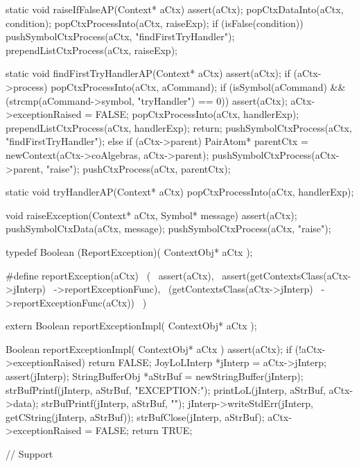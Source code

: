 static void raiseIfFalseAP(Context* aCtx) {
  assert(aCtx);
  popCtxDataInto(aCtx, condition);
  popCtxProcessInto(aCtx, raiseExp);
  if (isFalse(condition)) {
    pushSymbolCtxProcess(aCtx, "findFirstTryHandler");
    prependListCtxProcess(aCtx, raiseExp);
  }
}

static void findFirstTryHandlerAP(Context* aCtx) {
  assert(aCtx);
  if (aCtx->process) {
    popCtxProcessInto(aCtx, aCommand);
    if (isSymbol(aCommand) && (strcmp(aCommand->symbol, "tryHandler") == 0)) {
      assert(aCtx);
      aCtx->exceptionRaised = FALSE;
      popCtxProcessInto(aCtx, handlerExp);
      prependListCtxProcess(aCtx, handlerExp);
      return;
    }
    pushSymbolCtxProcess(aCtx, "findFirstTryHandler");
  } else {
    if (aCtx->parent) {
      PairAtom* parentCtx = newContext(aCtx->coAlgebras, aCtx->parent);
      pushSymbolCtxProcess(aCtx->parent, "raise");
      pushCtxProcess(aCtx, parentCtx);
    }
  }
}

static void tryHandlerAP(Context* aCtx) {
  popCtxProcessInto(aCtx, handlerExp);
}

void raiseException(Context* aCtx, Symbol* message) {
  assert(aCtx);
  pushSymbolCtxData(aCtx, message);
  pushSymbolCtxProcess(aCtx, "raise");
}
\stoptyping

\startCHeader
typedef Boolean (ReportException)(
  ContextObj* aCtx
);

#define reportException(aCtx)               \
  (                                         \
    assert(aCtx),                           \
    assert(getContextsClass(aCtx->jInterp)  \
      ->reportExceptionFunc),               \
    (getContextsClass(aCtx->jInterp)        \
      ->reportExceptionFunc(aCtx))          \
  )
\stopCHeader

\setCHeaderStream{private}
\startCHeader
extern Boolean reportExceptionImpl(
  ContextObj* aCtx
);
\stopCHeader
{}

\startCCode
Boolean reportExceptionImpl(
  ContextObj* aCtx
) {
  assert(aCtx);
  if (!aCtx->exceptionRaised) return FALSE;
  JoyLoLInterp *jInterp = aCtx->jInterp;
  assert(jInterp);
  StringBufferObj *aStrBuf = 
    newStringBuffer(jInterp);
  strBufPrintf(jInterp, aStrBuf, "\nUNHANDLED EXCEPTION:\n");
  printLoL(jInterp, aStrBuf, aCtx->data);
  strBufPrintf(jInterp, aStrBuf, "\n");
  jInterp->writeStdErr(jInterp, getCString(jInterp, aStrBuf));
  strBufClose(jInterp, aStrBuf);
  aCtx->exceptionRaised = FALSE;
  return TRUE;
}
\stopCCode

\starttyping
// Support

